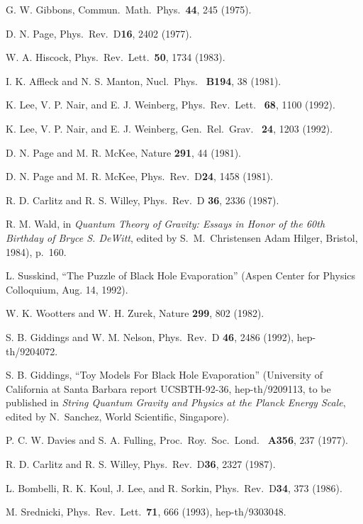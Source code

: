 \documentclass[12pt]{article}
\begin{document}
\begin{thebibliography}{999}
 G. W. Gibbons, Commun.\ Math.\ Phys.\ {\bf 44}, 245
(1975).

 D. N. Page, Phys.\ Rev.\ D{\bf 16}, 2402 (1977).

 W. A. Hiscock, Phys.\ Rev.\ Lett.\ {\bf 50}, 1734
(1983).

 I. K. Affleck and N. S. Manton, Nucl.\ Phys.\ {\bf
B194}, 38
(1981).

 K. Lee, V. P. Nair, and E. J. Weinberg, Phys.\ Rev.\
Lett.\
{\bf
68}, 1100 (1992).

 K. Lee, V. P. Nair, and E. J. Weinberg, Gen.\ Rel.\
Grav.\ {\bf
24}, 1203 (1992).

 D. N. Page and M. R. McKee, Nature {\bf 291}, 44
(1981).

\bibitem{PM2} D. N. Page and M. R. McKee, Phys.\ Rev.\ D{\bf 24},
1458 (1981).

\bibitem{CW87} R. D. Carlitz and R. S. Willey, Phys.\ Rev.\ D{\bf
36}, 2336
(1987).

 R. M. Wald, in {\em Quantum Theory of Gravity:
Essays in
Honor
of the 60th Birthday of Bryce S. DeWitt}, edited by S.~M.~Christensen
Adam
Hilger, Bristol, 1984), p.~160.

 L. Susskind, ``The Puzzle of Black Hole
Evaporation'' (Aspen
Center for Physics Colloquium, Aug. 14, 1992).

\bibitem{WooZur}  W. K. Wootters and W. H. Zurek, Nature {\bf 299},
802
(1982).

 S. B. Giddings and W. M. Nelson, Phys.\ Rev.\ D{\bf
46}, 2486
(1992), hep-th/9204072.

 S. B. Giddings, ``Toy Models For Black Hole
Evaporation''
(University of California at Santa Barbara report UCSBTH-92-36,
hep-th/9209113,
to be published in {\em String Quantum Gravity and Physics at the
Planck Energy
Scale}, edited by N.~Sanchez, World Scientific, Singapore).

 P. C. W. Davies and S. A. Fulling, Proc.\ Roy.\
Soc.\ Lond.\
{\bf
A356}, 237 (1977).

\bibitem{CW2} R. D. Carlitz and R. S. Willey, Phys.\ Rev.\ D{\bf 36},
2327
(1987).

 L. Bombelli, R. K. Koul, J. Lee, and R. Sorkin,
Phys.\ Rev.\ D{\bf 34}, 373 (1986).

 M. Srednicki, Phys.\ Rev.\ Lett.\ {\bf 71}, 666
(1993),
hep-th/9303048.


\end{thebibliography}
\end{document}
